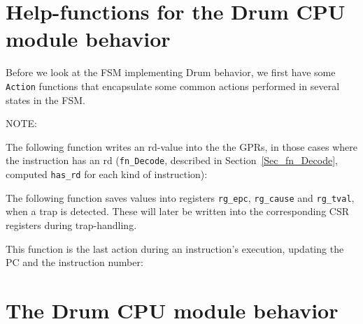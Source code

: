 \section{Help-functions for the Drum CPU module behavior}

\label{Sec_Drum_FSM_help_fns}

Before we look at the FSM implementing Drum behavior, we first have
some \verb|Action| functions that encapsulate some common actions
performed in several states in the FSM.

\vspace{2ex}

NOTE:

\vspace{1ex}

The following function writes an rd-value into the the GPRs, in those
cases where the instruction has an rd (\verb|fn_Decode|, described in
Section~\ref{Sec_fn_Decode}, computed \verb|has_rd| for each kind of
instruction):



The following function saves values into registers \verb|rg_epc|,
\verb|rg_cause| and \verb|rg_tval|, when a trap is detected.  These
will later be written into the corresponding CSR registers during
trap-handling.



This function is the last action during an instruction's execution,
updating the PC and the instruction number:




\section{The Drum CPU module behavior}

\label{Sec_Drum_CPU_module_behavior}


